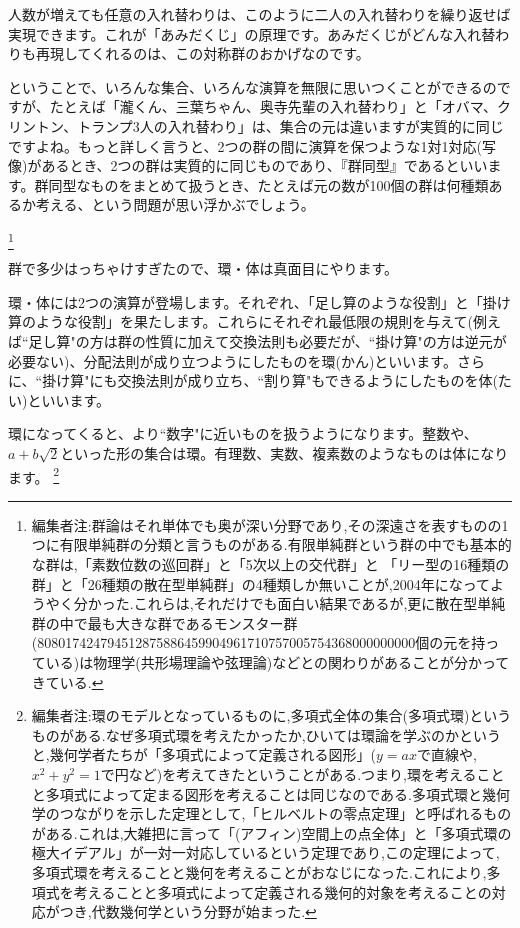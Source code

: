 人数が増えても任意の入れ替わりは、このように二人の入れ替わりを繰り返せば実現できます。これが「あみだくじ」の原理です。あみだくじがどんな入れ替わりも再現してくれるのは、この対称群のおかげなのです。

ということで、いろんな集合、いろんな演算を無限に思いつくことができるのですが、たとえば「瀧くん、三葉ちゃん、奥寺先輩の入れ替わり」と「オバマ、クリントン、トランプ3人の入れ替わり」は、集合の元は違いますが実質的に同じですよね。もっと詳しく言うと、2つの群の間に演算を保つような1対1対応(写像)があるとき、2つの群は実質的に同じものであり、『群同型』であるといいます。群同型なものをまとめて扱うとき、たとえば元の数が100個の群は何種類あるか考える、という問題が思い浮かぶでしょう。

\footnote{編集者注:群論はそれ単体でも奥が深い分野であり,その深遠さを表すものの1つに有限単純群の分類と言うものがある.有限単純群という群の中でも基本的な群は,「素数位数の巡回群」と「5次以上の交代群」と
「リー型の16種類の群」と「26種類の散在型単純群」の4種類しか無いことが,2004年になってようやく分かった.これらは,それだけでも面白い結果であるが,更に散在型単純群の中で最も大きな群であるモンスター群(808017424794512875886459904961710757005754368000000000個の元を持っている)は物理学(共形場理論や弦理論)などとの関わりがあることが分かってきている.}

群で多少はっちゃけすぎたので、環・体は真面目にやります。

環・体には2つの演算が登場します。それぞれ、「足し算のような役割」と「掛け算のような役割」を果たします。これらにそれぞれ最低限の規則を与えて(例えば``足し算"の方は群の性質に加えて交換法則も必要だが、``掛け算"の方は逆元が必要ない)、分配法則が成り立つようにしたものを環(かん)といいます。さらに、``掛け算"にも交換法則が成り立ち、``割り算"もできるようにしたものを体(たい)といいます。

環になってくると、より``数字"に近いものを扱うようになります。整数や、$a + b\sqrt{2}$といった形の集合は環。有理数、実数、複素数のようなものは体になります。
\footnote{編集者注:環のモデルとなっているものに,多項式全体の集合(多項式環)というものがある.なぜ多項式環を考えたかったか,ひいては環論を学ぶのかというと,幾何学者たちが「多項式によって定義される図形」($y=ax$で直線や,$x^2+y^2=1$で円など)を考えてきたということがある.つまり,環を考えることと多項式によって定まる図形を考えることは同じなのである.多項式環と幾何学のつながりを示した定理として,「ヒルベルトの零点定理」と呼ばれるものがある.これは,大雑把に言って「(アフィン)空間上の点全体」と「多項式環の極大イデアル」が一対一対応しているという定理であり,この定理によって,多項式環を考えることと幾何を考えることがおなじになった.これにより,多項式を考えることと多項式によって定義される幾何的対象を考えることの対応がつき,代数幾何学という分野が始まった.}


